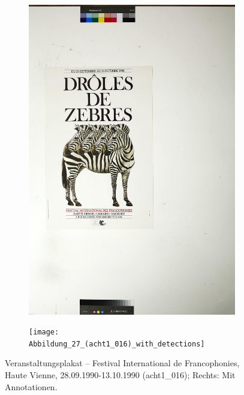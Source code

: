 \documentclass[a4paper,12pt,ngerman]{article}
\begin{document}
\newpage
\begin{landscape}
\begin{figure}[ht]
	\begin{subfigure}[b]{0.5\linewidth}
	\centering
	\includegraphics[height=\linewidth]{Abbildung_31_(acht1_016)}
	\end{subfigure}
	\begin{subfigure}[b]{0.5\linewidth}
	\centering
	\texttt{[image: Abbildung\_27\_(acht1\_016)\_with\_detections]}
	\end{subfigure}
	\caption{Veranstaltungsplakat – Festival International de Francophonies, Haute Vienne, 28.09.1990-13.10.1990 (acht1\_016); Rechts: Mit Annotationen.}
\end{figure}
\end{landscape}
\end{document}
